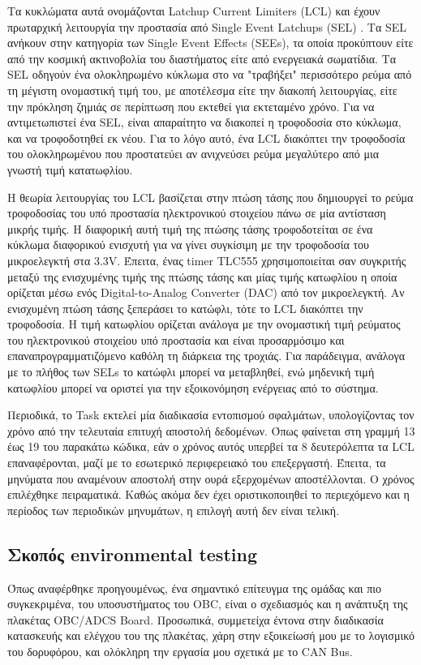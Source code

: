 \documentclass[a4paper,nobib,justified]{tufte-book}
\begin{document}
Τα κυκλώματα αυτά ονομάζονται Latchup Current Limiters (LCL) και έχουν πρωταρχική λειτουργία την προστασία από Single Event Latchups (SEL) . Tα SEL ανήκουν στην κατηγορία των Single Event Effects (SEEs), τα οποία προκύπτουν είτε από την κοσμική ακτινοβολία του διαστήματος είτε από ενεργειακά σωματίδια. Tα SEL οδηγούν ένα ολοκληρωμένο κύκλωμα στο να "τραβήξει" περισσότερο ρεύμα από τη μέγιστη ονομαστική τιμή του, με αποτέλεσμα είτε την διακοπή λειτουργίας, είτε την πρόκληση ζημιάς σε περίπτωση που εκτεθεί για εκτεταμένο χρόνο. Για να αντιμετωπιστεί ένα SEL, είναι απαραίτητο να διακοπεί η τροφοδοσία στο κύκλωμα, και να τροφοδοτηθεί εκ νέου. Για το λόγο αυτό, ένα LCL διακόπτει την τροφοδοσία του ολοκληρωμένου που προστατεύει αν ανιχνεύσει ρεύμα μεγαλύτερο από μια γνωστή τιμή κατατωφλίου.

Η θεωρία λειτουργίας του LCL βασίζεται στην πτώση τάσης που δημιουργεί το ρεύμα τροφοδοσίας του υπό προστασία ηλεκτρονικού στοιχείου πάνω σε μία αντίσταση μικρής τιμής. Η διαφορική αυτή τιμή της πτώσης τάσης τροφοδοτείται σε ένα κύκλωμα διαφορικού ενισχυτή για να γίνει συγκίσιμη με την τροφοδοσία του μικροελεγκτή στα 3.3V. Έπειτα, ένας timer TLC555 χρησιμοποιείται σαν συγκριτής μεταξύ της ενισχυμένης τιμής της πτώσης τάσης και μίας τιμής κατωφλίου η οποία ορίζεται μέσω ενός Digital-to-Analog Converter (DAC) από τον μικροελεγκτή. Αν ενισχυμένη πτώση τάσης ξεπεράσει το κατώφλι, τότε το LCL διακόπτει την τροφοδοσία. Η τιμή κατωφλίου ορίζεται ανάλογα με την ονομαστική τιμή ρεύματος του ηλεκτρονικού στοιχείου υπό προστασία και είναι προσαρμόσιμο και επαναπρογραμματιζόμενο καθόλη τη διάρκεια της τροχιάς. Για παράδειγμα, ανάλογα με το πλήθος των SELs το κατώφλι μπορεί να μεταβληθεί, ενώ μηδενική τιμή κατωφλίου μπορεί να οριστεί για την εξοικονόμηση ενέργειας από το σύστημα.

Περιοδικά, το Task εκτελεί μία διαδικασία εντοπισμού σφαλμάτων, υπολογίζοντας τον χρόνο από την τελευταία επιτυχή αποστολή δεδομένων. Όπως φαίνεται στη γραμμή 13 έως 19 του παρακάτω κώδικα, εάν ο χρόνος αυτός υπερβεί τα 8 δευτερόλεπτα τα LCL επαναφέρονται, μαζί με το εσωτερικό περιφερειακό του επεξεργαστή. Έπειτα, τα μηνύματα που αναμένουν αποστολή στην ουρά εξερχομένων αποστέλλονται. Ο χρόνος επιλέχθηκε πειραματικά. Καθώς ακόμα δεν έχει οριστικοποιηθεί το περιεχόμενο και η περίοδος των περιοδικών μηνυμάτων, η επιλογή αυτή δεν είναι τελική.

\subsection{Σκοπός environmental testing}
Όπως αναφέρθηκε προηγουμένως, ένα σημαντικό επίτευγμα της ομάδας και πιο συγκεκριμένα, του υποσυστήματος του OBC, είναι ο σχεδιασμός και η ανάπτυξη της πλακέτας OBC/ADCS Board. Προσωπικά, συμμετείχα έντονα στην διαδικασία κατασκευής και ελέγχου του της πλακέτας, χάρη στην εξοικείωσή μου με το λογισμικό του δορυφόρου, και ολόκληρη την εργασία μου σχετικά με το CAN Bus.
\end{document}
